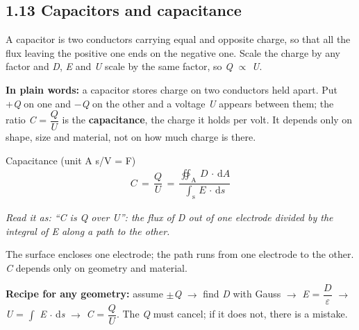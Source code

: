 \documentclass[11pt]{article}
\begin{document}
\begin{keepsection}
\section{1.13 Capacitors and capacitance}

A capacitor is two conductors carrying equal and opposite charge, so that all the flux leaving the positive one ends on the negative one. Scale the charge by any factor and \textit{D}, \textit{E} and \textit{U} scale by the same factor, so \textit{Q} \ensuremath{\propto} \textit{U}.

\begin{plainbox}\textbf{In plain words:} a capacitor stores charge on two conductors held apart. Put +\textit{Q} on one and \ensuremath{-}\textit{Q} on the other and a voltage \textit{U} appears between them; the ratio \textit{C} = {\small\ensuremath{\dfrac{{Q}}{{U}}}} is the \textbf{capacitance}, the charge it holds per volt. It depends only on shape, size and material, not on how much charge is there.\end{plainbox}

\begin{equationcard}{Capacitance (unit A s/V = F)}
\[ \begin{gathered} {C}\, =\, \dfrac{{Q}}{{U}}\, =\, \dfrac{\oiint_{\mathrm{A}} \, {D}\, \cdot \, \mathrm{d}{A}}{\int_{\mathrm{s}} \, {E}\, \cdot \, \mathrm{d}{s}} \end{gathered} \]
{\small \emph{Read it as: “C is Q over U”: the flux of D out of one electrode divided by the integral of E along a path to the other.}\par The surface encloses one electrode; the path runs from one electrode to the other. \textit{C} depends only on geometry and material.}
\end{equationcard}

\begin{notebox}\textbf{Recipe for any geometry:} assume \ensuremath{\pm}\textit{Q} \ensuremath{\to} find \textit{D} with Gauss \ensuremath{\to} \textit{E} = {\small\ensuremath{\dfrac{{D}}{ε}}} \ensuremath{\to} \textit{U} = $\int $ \textit{E} \ensuremath{\cdot} d\textit{s} \ensuremath{\to} \textit{C} = {\small\ensuremath{\dfrac{{Q}}{{U}}}}. The \textit{Q} must cancel; if it does not, there is a mistake.\end{notebox}


\end{keepsection}
\end{document}
